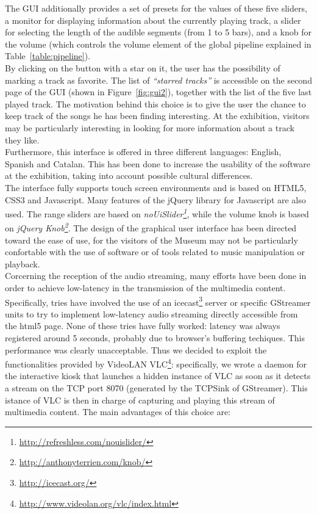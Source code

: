 The GUI additionally provides a set of presets for the values of these five sliders, a monitor for displaying information about the currently playing track, a slider for selecting the length of the audible segments (from 1 to 5 bars), and a knob for the volume (which controls the volume element of the global pipeline explained in Table~\ref{table:pipeline}). \\ By clicking on the button with a star on it, the user has the possibility of marking a track as favorite. The list of \textit{``starred tracks''} is accessible on the second page of the GUI (shown in Figure~\ref{fig:gui2}), together with the list of the five last played track. The motivation behind this choice is to give the user the chance to keep track of the songs he has been finding interesting. At the exhibition, visitors may be particularly interesting in looking for more information about a track they like. \\ 
Furthermore, this interface is offered in three different languages: English, Spanish and Catalan. This has been done to increase the usability of the software at the exhibition, taking into account possible cultural differences. \\
The interface fully supports touch screen environments and is based on HTML5, CSS3 and Javascript. Many features of the jQuery library for Javascript are also used. The range sliders are based on \textit{noUiSlider\footnote{\url{http://refreshless.com/nouislider/}}}, while the volume knob is based on \textit{jQuery Knob\footnote{\url{http://anthonyterrien.com/knob/}}}. The design of the graphical user interface has been directed toward the ease of use, for the visitors of the Museum may not be particularly confortable with the use of software or of tools related to music manipulation or playback. \\
Corcerning the reception of the audio streaming, many efforts have been done in order to achieve low-latency in the transmission of the multimedia content. Specifically, tries have involved the use of an icecast\footnote{\url{http://icecast.org/}} server or specific GStreamer units to try to implement low-latency audio streaming directly accessible from the html5 page. None of these tries have fully worked: latency was always registered around 5 seconds, probably due to browser's buffering techiques. This performance was clearly unacceptable. Thus we decided to exploit the functionalities provided by VideoLAN VLC\footnote{\url{http://www.videolan.org/vlc/index.html}}: specifically, we wrote a daemon for the interactive kiosk that launches a hidden instance of VLC as soon as it detects a stream on the TCP port 8070 (generated by the TCPSink of GStreamer). This istance of VLC is then in charge of capturing and playing this stream of multimedia content. The main advantages of this choice are:
